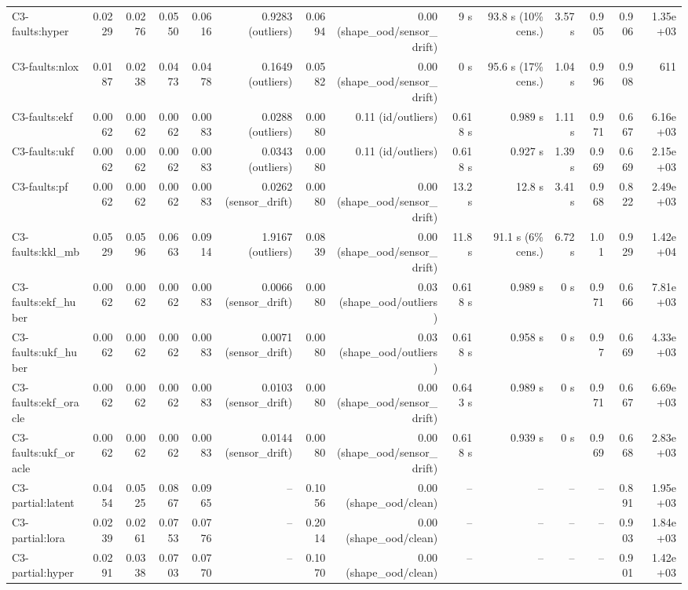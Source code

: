 \begin{table}[t]
\begin{tabular}{lrrrrrrrrrrrrr}
C3-faults:hyper & 0.0229 & 0.0276 & 0.0550 & 0.0616 & 0.9283 (outliers) & 0.0694 & 0.00 (shape\_ood/sensor\_drift) & 9 s & 93.8 s (10\% cens.) & 3.57 s & 0.905 & 0.906 & 1.35e+03 \\
C3-faults:nlox & 0.0187 & 0.0238 & 0.0473 & 0.0478 & 0.1649 (outliers) & 0.0582 & 0.00 (shape\_ood/sensor\_drift) & 0 s & 95.6 s (17\% cens.) & 1.04 s & 0.996 & 0.908 & 611 \\
C3-faults:ekf & 0.0062 & 0.0062 & 0.0062 & 0.0083 & 0.0288 (outliers) & 0.0080 & 0.11 (id/outliers) & 0.618 s & 0.989 s & 1.11 s & 0.971 & 0.667 & 6.16e+03 \\
C3-faults:ukf & 0.0062 & 0.0062 & 0.0062 & 0.0083 & 0.0343 (outliers) & 0.0080 & 0.11 (id/outliers) & 0.618 s & 0.927 s & 1.39 s & 0.969 & 0.669 & 2.15e+03 \\
C3-faults:pf & 0.0062 & 0.0062 & 0.0062 & 0.0083 & 0.0262 (sensor\_drift) & 0.0080 & 0.00 (shape\_ood/sensor\_drift) & 13.2 s & 12.8 s & 3.41 s & 0.968 & 0.822 & 2.49e+03 \\
C3-faults:kkl\_mb & 0.0529 & 0.0596 & 0.0663 & 0.0914 & 1.9167 (outliers) & 0.0839 & 0.00 (shape\_ood/sensor\_drift) & 11.8 s & 91.1 s (6\% cens.) & 6.72 s & 1.01 & 0.929 & 1.42e+04 \\
C3-faults:ekf\_huber & 0.0062 & 0.0062 & 0.0062 & 0.0083 & 0.0066 (sensor\_drift) & 0.0080 & 0.03 (shape\_ood/outliers) & 0.618 s & 0.989 s & 0 s & 0.971 & 0.666 & 7.81e+03 \\
C3-faults:ukf\_huber & 0.0062 & 0.0062 & 0.0062 & 0.0083 & 0.0071 (sensor\_drift) & 0.0080 & 0.03 (shape\_ood/outliers) & 0.618 s & 0.958 s & 0 s & 0.97 & 0.669 & 4.33e+03 \\
C3-faults:ekf\_oracle & 0.0062 & 0.0062 & 0.0062 & 0.0083 & 0.0103 (sensor\_drift) & 0.0080 & 0.00 (shape\_ood/sensor\_drift) & 0.643 s & 0.989 s & 0 s & 0.971 & 0.667 & 6.69e+03 \\
C3-faults:ukf\_oracle & 0.0062 & 0.0062 & 0.0062 & 0.0083 & 0.0144 (sensor\_drift) & 0.0080 & 0.00 (shape\_ood/sensor\_drift) & 0.618 s & 0.939 s & 0 s & 0.969 & 0.668 & 2.83e+03 \\
C3-partial:latent & 0.0454 & 0.0525 & 0.0867 & 0.0965 & – & 0.1056 & 0.00 (shape\_ood/clean) & – & – & – & – & 0.891 & 1.95e+03 \\
C3-partial:lora & 0.0239 & 0.0261 & 0.0753 & 0.0776 & – & 0.2014 & 0.00 (shape\_ood/clean) & – & – & – & – & 0.903 & 1.84e+03 \\
C3-partial:hyper & 0.0291 & 0.0338 & 0.0703 & 0.0770 & – & 0.1070 & 0.00 (shape\_ood/clean) & – & – & – & – & 0.901 & 1.42e+03 \\

\end{tabular}
\end{table}

